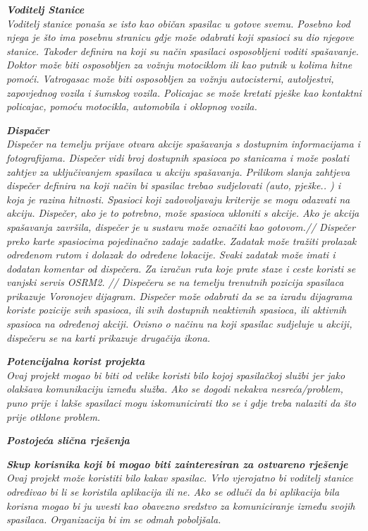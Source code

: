 		\textbf{\textit{Voditelj Stanice}}\\
		\textit{Voditelj stanice ponaša se isto kao običan spasilac u gotove svemu. Posebno kod njega je što ima posebnu stranicu gdje može odabrati koji spasioci su dio njegove stanice. Također definira na koji su način spasilaci osposobljeni voditi spašavanje. Doktor može biti osposobljen za vožnju motociklom ili kao putnik u kolima hitne pomoći. Vatrogasac može biti osposobljen za vožnju autocisterni, autoljestvi, zapovjednog vozila i šumskog vozila. Policajac se može kretati pješke kao kontaktni policajac, pomoću motocikla, automobila i oklopnog vozila.}
		
		\textbf{\textit{Dispačer}}\\
		\textit{Dispečer na temelju prijave otvara akcije spašavanja s dostupnim informacijama i fotografijama. Dispečer vidi broj dostupnih spasioca po stanicama i može poslati zahtjev za uključivanjem spasilaca u akciju spašavanja. Prilikom slanja zahtjeva dispečer definira na koji način bi spasilac trebao sudjelovati (auto, pješke.. ) i koja je razina hitnosti. Spasioci koji zadovoljavaju kriterije se mogu odazvati na akciju. Dispečer, ako je to potrebno, može spasioca ukloniti s akcije. Ako je akcija spašavanja završila, dispečer je u sustavu može označiti kao gotovom.//
		Dispečer preko karte spasiocima pojedinačno zadaje zadatke. Zadatak može tražiti prolazak određenom rutom i dolazak do određene lokacije. Svaki zadatak može imati i dodatan komentar od dispečera. Za izračun ruta koje prate staze i ceste koristi se vanjski servis OSRM2. //
		Dispečeru se na temelju trenutnih pozicija spasilaca prikazuje Voronojev dijagram. Dispečer može odabrati da se za izradu dijagrama koriste pozicije svih spasioca, ili svih dostupnih neaktivnih spasioca, ili aktivnih spasioca na određenoj akciji. Ovisno o načinu na koji spasilac sudjeluje u akciji, dispečeru se na karti prikazuje drugačija ikona.
		}
	
		\textbf{\textit{Potencijalna korist projekta}}\\
		\textit{Ovaj projekt mogao bi biti od velike koristi bilo kojoj spasilačkoj službi jer jako olakšava komunikaciju između služba. Ako se dogodi nekakva nesreća/problem, puno prije i lakše spasilaci mogu iskomunicirati tko se i gdje treba nalaziti da što prije otklone problem.}
		
		\textbf{\textit{Postojeća slična rješenja}}\\
		\textit{}
		
		\textbf{\textit{Skup korisnika koji bi mogao biti zainteresiran za ostvareno rješenje}}\\
		\textit{Ovaj projekt može koristiti bilo kakav spasilac. Vrlo vjerojatno bi voditelj stanice određivao bi li se koristila aplikacija ili ne. Ako se odluči da bi aplikacija bila korisna mogao bi ju uvesti kao obavezno sredstvo za komuniciranje između svojih spasilaca. Organizacija bi im se odmah poboljšala.}
		
